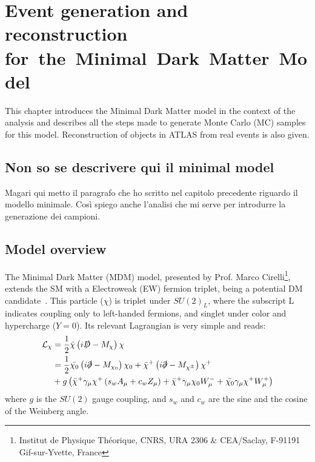 \chapter[Events for the Minimal Dark Matter model]{Event generation and reconstruction \mbox{for the Minimal Dark Matter Model}}

\lettrine{T}{}his chapter introduces the Minimal Dark Matter model in the context of the \mph analysis and describes all the steps made to generate Monte Carlo (MC) samples for this model. Reconstruction of objects in ATLAS from real events is also given.

\section{Non so se descrivere qui il minimal model}
Magari qui metto il paragrafo che ho scritto nel capitolo precedente riguardo il modello minimale. Cos\`i  spiego anche l'analisi \mph che mi serve per introdurre la generazione dei campioni.

\section{Model overview}
The Minimal Dark Matter (MDM) model, presented by Prof. Marco Cirelli\footnote{Institut de Physique Th\'eorique, CNRS, URA 2306 \& CEA/Saclay, F-91191 Gif-sur-Yvette, France}, extends the SM with a Electroweak (EW) fermion triplet, being a potential DM candidate~\cite{Cirelli:paper}. This particle ($\chi$) is triplet under $SU(2)_L$, where the subscript L indicates coupling only to left-handed fermions, and singlet under color and hypercharge ($Y=0$). Its relevant Lagrangian is very simple and reads:
\begin{equation}
\begin{split}
\mathcal{L}_\chi&=\frac{1}{2}\bar{\chi}\left(i\slashed{D}-M_\chi\right)\chi \\
			&= \frac{1}{2}\bar{\chi_0}\left(i\slashed{\partial}-M_{\chi_0}\right)\chi_0+\bar{\chi}^+\left(i\slashed{\partial}-M_{\chi^\pm}\right)\chi^+ \\
			&+ g \left(\bar{\chi}^+\gamma_\mu\chi^+\left(s_w A_\mu + c_w Z_\mu \right) +\bar{\chi}^+ \gamma_\mu\chi_0W^-_\mu + \bar{\chi_0}\gamma_\mu\chi^+W^+_\mu \right)
\end{split}
\end{equation}
where $g$ is the $SU(2)$ gauge coupling, and $s_w$ and $c_w$ are the sine and the cosine of the Weinberg angle.

